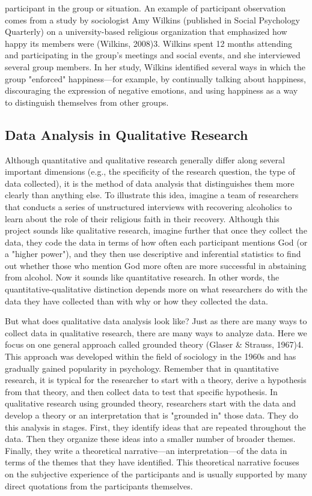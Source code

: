 participant in the group or situation. An example of participant observation comes from a study by sociologist Amy Wilkins (published in Social Psychology Quarterly) on a university-based religious organization that emphasized how happy its members were (Wilkins, 2008)3. Wilkins spent 12 months attending and participating in the group's meetings and social events, and she interviewed several group members. In her study, Wilkins identified several ways in which the group "enforced" happiness---for example, by continually talking about happiness, discouraging the expression of negative emotions, and using happiness as a way to distinguish themselves from other groups.

\subsection{Data Analysis in Qualitative Research}

Although quantitative and qualitative research generally differ along several important dimensions (e.g., the specificity of the research question, the type of data collected), it is the method of data analysis that distinguishes them more clearly than anything else. To illustrate this idea, imagine a team of researchers that conducts a series of unstructured interviews with recovering alcoholics to learn about the role of their religious faith in their recovery. Although this project sounds like qualitative research, imagine further that once they collect the data, they code the data in terms of how often each participant mentions God (or a "higher power"), and they then use descriptive and inferential statistics to find out whether those who mention God more often are more successful in abstaining from alcohol. Now it sounds like quantitative research. In other words, the quantitative-qualitative distinction depends more on what researchers do with the data they have collected than with why or how they collected the data.

But what does qualitative data analysis look like? Just as there are many ways to collect data in qualitative research, there are many ways to analyze data. Here we focus on one general approach called grounded theory (Glaser \& Strauss, 1967)4. This approach was developed within the field of sociology in the 1960s and has gradually gained popularity in psychology. Remember that in quantitative research, it is typical for the researcher to start with a theory, derive a hypothesis from that theory, and then collect data to test that specific hypothesis. In qualitative research using grounded theory, researchers start with the data and develop a theory or an interpretation that is "grounded in" those data. They do this analysis in stages. First, they identify ideas that are repeated throughout the data. Then they organize these ideas into a smaller number of broader themes. Finally, they write a theoretical narrative---an interpretation---of the data in terms of the themes that they have identified. This theoretical narrative focuses on the subjective experience of the participants and is usually supported by many direct quotations from the participants themselves.

